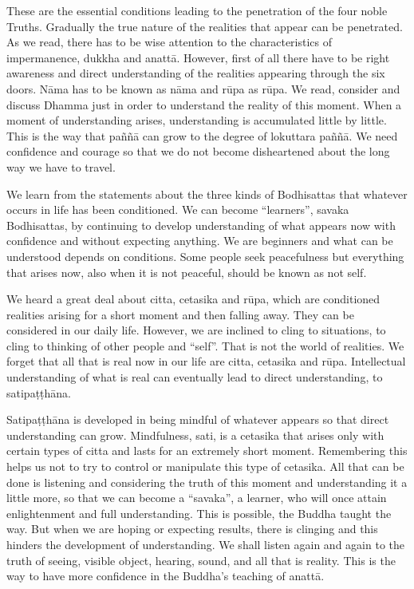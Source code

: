 These are the essential conditions leading to the penetration of the
four noble Truths. Gradually the true nature of the realities that
appear can be penetrated. As we read, there has to be wise attention to
the characteristics of impermanence, dukkha and anattā. However, first
of all there have to be right awareness and direct understanding of the
realities appearing through the six doors. Nāma has to be known as nāma
and rūpa as rūpa. We read, consider and discuss Dhamma just in order to
understand the reality of this moment. When a moment of understanding
arises, understanding is accumulated little by little. This is the way
that paññā can grow to the degree of lokuttara paññā. We need confidence
and courage so that we do not become disheartened about the long way we
have to travel.

We learn from the statements about the three kinds of Bodhisattas that
whatever occurs in life has been conditioned. We can become
``learners'', savaka Bodhisattas, by continuing to develop
understanding of what appears now with confidence and without expecting
anything. We are beginners and what can be understood depends on
conditions. Some people seek peacefulness but everything that arises
now, also when it is not peaceful, should be known as not self.

We heard a great deal about citta, cetasika and rūpa, which are
conditioned realities arising for a short moment and then falling away.
They can be considered in our daily life. However, we are inclined to
cling to situations, to cling to thinking of other people and ``self''.
That is not the world of realities. We forget that all that is real now
in our life are citta, cetasika and rūpa. Intellectual understanding of
what is real can eventually lead to direct understanding, to
satipaṭṭhāna.

Satipaṭṭhāna is developed in being mindful of whatever appears so that
direct understanding can grow. Mindfulness, sati, is a cetasika that
arises only with certain types of citta and lasts for an extremely short
moment. Remembering this helps us not to try to control or manipulate
this type of cetasika. All that can be done is listening and considering
the truth of this moment and understanding it a little more, so that we
can become a ``savaka'', a learner, who will once attain enlightenment
and full understanding. This is possible, the Buddha taught the way. But
when we are hoping or expecting results, there is clinging and this
hinders the development of understanding. We shall listen again and
again to the truth of seeing, visible object, hearing, sound, and all
that is reality. This is the way to have more confidence in the Buddha's
teaching of anattā.

